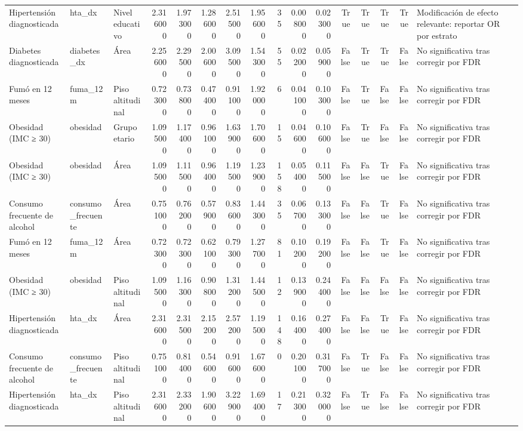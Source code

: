\begin{table}[htbp]
\begin{tabular}{lllrrrrrrrrrrrrl}
Hipertensión diagnosticada & hta\_dx & Nivel educativo & 2.316000 & 1.973000 & 1.286000 & 2.515000 & 1.956000 & 35 & 0.008000 & 0.023000 & True & True & True & True & Modificación de efecto relevante: reportar OR por estrato \\
Diabetes diagnosticada & diabetes\_dx & Área & 2.256000 & 2.295000 & 2.006000 & 3.095000 & 1.543000 & 55 & 0.022000 & 0.059000 & False & True & True & False & No significativa tras corregir por FDR \\
Fumó en 12 meses & fuma\_12m & Piso altitudinal & 0.723000 & 0.738000 & 0.474000 & 0.911000 & 1.920000 & 6 & 0.041000 & 0.103000 & False & True & False & False & No significativa tras corregir por FDR \\
Obesidad (IMC ≥ 30) & obesidad & Grupo etario & 1.095000 & 1.174000 & 0.961000 & 1.639000 & 1.706000 & 15 & 0.046000 & 0.106000 & False & True & False & False & No significativa tras corregir por FDR \\
Obesidad (IMC ≥ 30) & obesidad & Área & 1.095000 & 1.115000 & 0.964000 & 1.195000 & 1.239000 & 158 & 0.054000 & 0.115000 & False & False & True & False & No significativa tras corregir por FDR \\
Consumo frecuente de alcohol & consumo\_frecuente & Área & 0.751000 & 0.762000 & 0.579000 & 0.836000 & 1.443000 & 35 & 0.067000 & 0.133000 & False & False & True & False & No significativa tras corregir por FDR \\
Fumó en 12 meses & fuma\_12m & Área & 0.723000 & 0.723000 & 0.621000 & 0.793000 & 1.277000 & 81 & 0.102000 & 0.192000 & False & False & True & False & No significativa tras corregir por FDR \\
Obesidad (IMC ≥ 30) & obesidad & Piso altitudinal & 1.095000 & 1.163000 & 0.908000 & 1.312000 & 1.445000 & 12 & 0.139000 & 0.244000 & False & False & False & False & No significativa tras corregir por FDR \\
Hipertensión diagnosticada & hta\_dx & Área & 2.316000 & 2.315000 & 2.152000 & 2.572000 & 1.195000 & 148 & 0.164000 & 0.274000 & False & False & True & False & No significativa tras corregir por FDR \\
Consumo frecuente de alcohol & consumo\_frecuente & Piso altitudinal & 0.751000 & 0.814000 & 0.546000 & 0.916000 & 1.676000 & 0 & 0.201000 & 0.317000 & False & True & False & False & No significativa tras corregir por FDR \\
Hipertensión diagnosticada & hta\_dx & Piso altitudinal & 2.316000 & 2.332000 & 1.906000 & 3.229000 & 1.694000 & 17 & 0.213000 & 0.320000 & False & True & False & False & No significativa tras corregir por FDR \\

\end{tabular}
\end{table}
